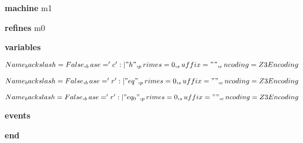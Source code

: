\begin{block}
  \item   \textbf{machine} m1
  \item   \textbf{refines} m0
  \item   \textbf{variables}
  \begin{block}
    \item   $Name {_backslash = False, _base = 'c' :| "h", _primes = 0, _suffix = "", _encoding = Z3Encoding}$
    \item   $Name {_backslash = False, _base = 'r' :| "eq", _primes = 0, _suffix = "", _encoding = Z3Encoding}$
    \item   $Name {_backslash = False, _base = 'r' :| "eq_0", _primes = 0, _suffix = "", _encoding = Z3Encoding}$
  \end{block}
  \item   
  \item   \textbf{events}
  \begin{block}
    \item   
    \item   
  \end{block}
  \item   \textbf{end} \\
\end{block}
